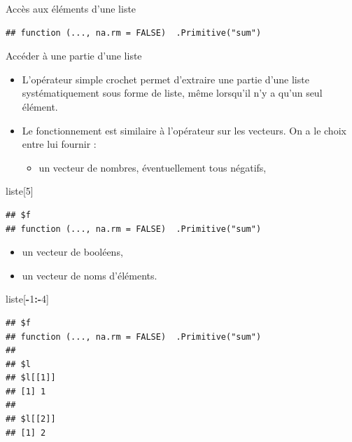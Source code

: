 \documentclass[
  ignorenonframetext,
]{beamer}
\newenvironment{Shaded}{\begin{snugshade}}{\end{snugshade}}
\newcommand{\DecValTok}[1]{\textcolor[rgb]{0.00,0.00,0.81}{#1}}
\newcommand{\NormalTok}[1]{#1}
\newcommand{\SpecialCharTok}[1]{\textcolor[rgb]{0.81,0.36,0.00}{\textbf{#1}}}
\providecommand{\tightlist}{%
  \setlength{\itemsep}{0pt}\setlength{\parskip}{0pt}}
\begin{document}
\begin{frame}[fragile]{Accès aux éléments d'une liste}
\tiny

\begin{Shaded}
\end{Shaded}

\begin{verbatim}
## function (..., na.rm = FALSE)  .Primitive("sum")
\end{verbatim}

\normalsize
\end{frame}

\begin{frame}[fragile]{Accéder à une partie d'une liste}
\protect\hypertarget{accuxe9der-uxe0-une-partie-dune-liste}{}
\begin{itemize}
\tightlist
\item
  L'opérateur simple crochet permet d'extraire une partie d'une liste
  systématiquement sous forme de liste, même lorsqu'il n'y a qu'un seul
  élément.
\item
  Le fonctionnement est similaire à l'opérateur sur les vecteurs. On a
  le choix entre lui fournir :

  \begin{itemize}
  \tightlist
  \item
    un vecteur de nombres, éventuellement tous négatifs,
  \end{itemize}
\end{itemize}

\tiny

\begin{Shaded}
\begin{Highlighting}[]
\NormalTok{liste[}\DecValTok{5}\NormalTok{]}
\end{Highlighting}
\end{Shaded}

\begin{verbatim}
## $f
## function (..., na.rm = FALSE)  .Primitive("sum")
\end{verbatim}

\normalsize

\begin{itemize}
\tightlist
\item
  un vecteur de booléens,
\item
  un vecteur de noms d'éléments.
\end{itemize}

\tiny

\begin{Shaded}
\begin{Highlighting}[]
\NormalTok{liste[}\SpecialCharTok{{-}}\DecValTok{1}\SpecialCharTok{:{-}}\DecValTok{4}\NormalTok{]}
\end{Highlighting}
\end{Shaded}

\begin{verbatim}
## $f
## function (..., na.rm = FALSE)  .Primitive("sum")
## 
## $l
## $l[[1]]
## [1] 1
## 
## $l[[2]]
## [1] 2
\end{verbatim}

\normalsize
\end{frame}
\end{document}
